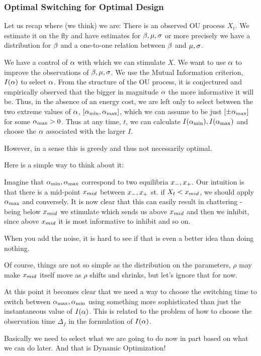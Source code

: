 \documentclass{article}
\begin{document}
\subsubsection{Optimal Switching for Optimal Design}
Let us recap where (we think) we are:
There is an observed OU process $X_t$. We estimate it on the fly and have
estimates for ${\beta}, {\mu }, {\sigma }$ or more precisely we have a distribution for ${\beta}$ and
a one-to-one relation between ${\beta}$ and ${\mu },{\sigma }$. 

We have a control of ${\alpha}$ with which we can stimulate $X$. We want to use ${\alpha}$
to improve the observations of ${\beta}, {\mu }, {\sigma }$. We use the Mutual Information
criterion, $I({\alpha})$ to select ${\alpha}$. From the structure of the OU process, it is
conjectured and empirically observed that the bigger in magnitude ${\alpha}$ the more
informative it will be. Thus, in the absence of an energy cost, we are left only
to select between the two extreme values of ${\alpha}$, $[{ {\alpha}_{\textrm{min}} }, { {\alpha}_{\textrm{max}} }]$, which
we can assume to be just $[\pm { {\alpha}_{\textrm{max}} }]$ for some ${ {\alpha}_{\textrm{max}} }>0$. Thus at any time, $t$,
we can calculate $I({ {\alpha}_{\textrm{min}} }), I({ {\alpha}_{\textrm{max}} })$ and choose the ${\alpha}$ associated with the larger $I$.

However, in a sense this is greedy and thus not necessarily optimal.

Here is a simple way to think about it:

Imagine that ${ {\alpha}_{\textrm{min}} }, { {\alpha}_{\textrm{max}} }$ correspond to two equilibria
${ x_{-} }, { x_{+} }$. Our intuition is that there is a mid-point ${ x_{mid} }$ between
${ x_{-} }, { x_{+} }$ st. if $X_t < { x_{mid} }$, we should apply ${ {\alpha}_{\textrm{max}} }$ and conversely. 
It is now clear that this can easily result in chattering - being below ${ x_{mid} }$
we stimulate which sends us above ${ x_{mid} }$ and then we inhibit, since above
${ x_{mid} }$ it is most informative to inhibit and so on. 

When you add the noise, it is hard to see if that is even a better idea than
doing nothing. 

Of course, things are not so simple as the distribution on the parameters,
$\rho$ may make ${ x_{mid} }$ itself move as $\rho$  shifts and shrinks, but let's
ignore that for now. 

At this point it becomes clear that we need a way to choose the switching time
to switch between  ${ {\alpha}_{\textrm{max}} }, { {\alpha}_{\textrm{min}} }$ using something more sophisticated than just
the instantaneous value of $I({\alpha})$. This is related to the problem of
how to choose the observation time $\Delta_f$ in the formulation of $I({\alpha})$. 

Basically we need to select what we are going to do now in part based on what we
can do later. And that is Dynamic Optimization!
\end{document}
